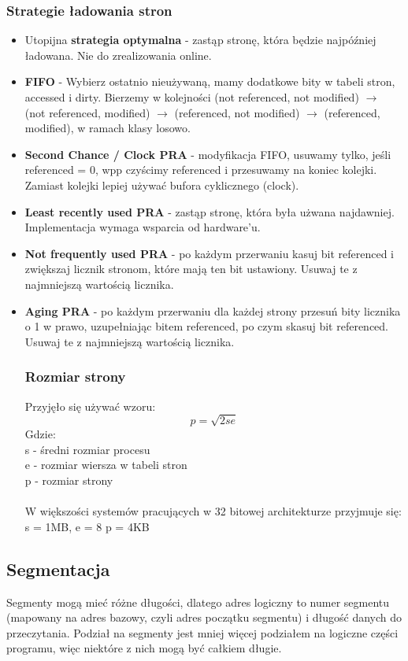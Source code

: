 \documentclass[12pt, a4paper, polish, openany]{book}
\begin{document}
\subsubsection{Strategie ładowania stron}
\begin{itemize}
  \item Utopijna \textbf{strategia optymalna} - zastąp stronę, która będzie najpóźniej ładowana. Nie do zrealizowania online.
  \item \textbf{FIFO} - Wybierz ostatnio nieużywaną, mamy dodatkowe bity w tabeli stron, accessed i dirty. Bierzemy w kolejności (not referenced, not modified) $\rightarrow$ (not referenced, modified) $\rightarrow$ (referenced, not modified) $\rightarrow$ (referenced, modified), w ramach klasy losowo.
  \item \textbf{Second Chance / Clock PRA} - modyfikacja FIFO, usuwamy tylko, jeśli referenced = 0, wpp czyścimy referenced i przesuwamy na koniec kolejki. Zamiast kolejki lepiej używać bufora cyklicznego (clock).
  \item \textbf{Least recently used PRA} - zastąp stronę, która była użwana najdawniej. Implementacja wymaga wsparcia od hardware'u.
  \item \textbf{Not frequently used PRA} - po każdym przerwaniu kasuj bit referenced i zwiększaj licznik stronom, które mają ten bit ustawiony. Usuwaj te z najmniejszą wartością licznika.
  \item \textbf{Aging PRA} - po każdym przerwaniu dla każdej strony przesuń bity licznika o 1 w prawo, uzupełniając bitem referenced, po czym skasuj bit referenced. Usuwaj te z najmniejszą wartością licznika.
\subsubsection{Rozmiar strony}
Przyjęło się używać wzoru:
\begin{equation}
p = \sqrt{2se}
\end{equation}
Gdzie:\\
s - średni rozmiar procesu\\
e - rozmiar wiersza w tabeli stron\\
p - rozmiar strony\\\\
W większości systemów pracujących w 32 bitowej architekturze przyjmuje się:\\
s = 1MB, e = 8 \implies p = 4KB
\end{itemize}
\subsection{Segmentacja}
Segmenty mogą mieć różne długości, dlatego adres logiczny to numer segmentu (mapowany na adres bazowy, czyli adres początku segmentu) i długość danych do przeczytania. Podział na segmenty jest mniej więcej podziałem na logiczne części programu, więc niektóre z nich mogą być całkiem długie.
\end{document}
